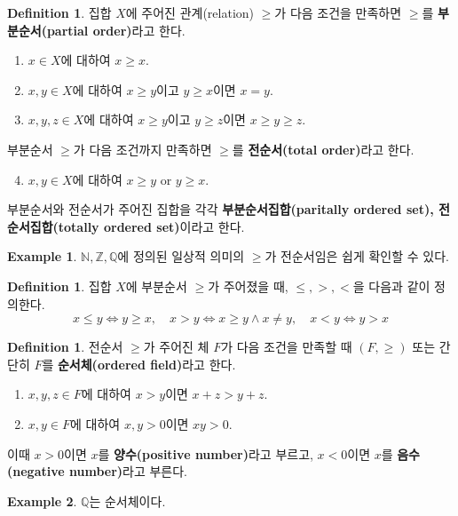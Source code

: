 \documentclass[11pt]{book}
\numberwithin{equation}{chapter}
\def\NN{\mathbb{N}}
\def\ZZ{\mathbb{Z}}
\def\QQ{\mathbb{Q}}
\theoremstyle{definition}
\newtheorem{defn}[thm]{Definition}
\newtheorem*{ex}{Example}
\begin{document}
    \begin{defn}
        집합 \(X\)에 주어진 관계(relation) \(\ge\)가 다음 조건을 만족하면 \(\ge\)를 \textbf{부분순서(partial order)}라고 한다.
        \begin{enumerate} [label=(O\arabic*), leftmargin=2\parindent]
            \item
            \(x \in X\)에 대하여 \(x \ge x\).
            \item
            \(x, y \in X\)에 대하여 \(x \ge y\)이고 \(y \ge x\)이면 \(x = y\).
            \item
            \(x, y, z \in X\)에 대하여 \(x \ge y\)이고 \(y \ge z\)이면 \(x \ge y \ge z\). 
        \end{enumerate}
        부분순서 \(\ge\)가 다음 조건까지 만족하면 \(\ge\)를 \textbf{전순서(total order)}라고 한다.
        \begin{enumerate}[label=(O\arabic*), leftmargin=2\parindent]
            \setcounter{enumi}{3}
            \item
            \(x, y \in X\)에 대하여 \(x \ge y\) or \(y \ge x\).
        \end{enumerate}
        부분순서와 전순서가 주어진 집합을 각각 \textbf{부분순서집합(paritally ordered set), 전순서집합(totally ordered set)}이라고 한다.
    \end{defn}

    \begin{ex}
        \(\NN, \ZZ, \QQ\)에 정의된 일상적 의미의 \(\ge\)가 전순서임은 쉽게 확인할 수 있다.
    \end{ex}
    \begin{defn}
        집합 \(X\)에 부분순서 \(\ge\)가 주어졌을 때, \(\le, >, <\)을 다음과 같이 정의한다.
        \[
        x \le y \iff y \ge x, \quad x > y \iff x \ge y \land x \ne y, \quad x < y \iff y > x
        \]
    \end{defn}

    \begin{defn}
        전순서 \(\ge\)가 주어진 체 \(F\)가 다음 조건을 만족할 때 \((F, \ge)\) 또는 간단히 \(F\)를 \textbf{순서체(ordered field)}라고 한다.
        \begin{enumerate}[label=(\alph*), leftmargin=2\parindent]
            \item \(x, y, z \in F\)에 대하여 \(x > y\)이면 \(x + z > y + z\).
            \item \(x, y \in F\)에 대하여 \(x, y > 0\)이면 \(xy > 0\).
        \end{enumerate}
        이때 \(x > 0\)이면 \(x\)를 \textbf{양수(positive number)}라고 부르고, \(x < 0\)이면 \(x\)를 \textbf{음수(negative number)}라고 부른다.
    \end{defn}
    \begin{ex}
        \(\QQ\)는 순서체이다.
    \end{ex}
\end{document}
